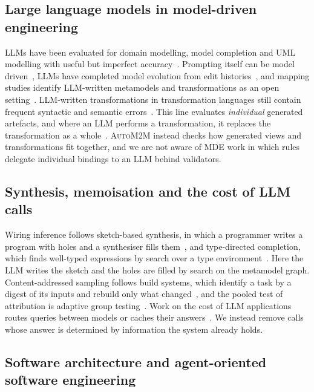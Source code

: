 \documentclass[pdflatex,sn-mathphys-num]{sn-jnl}
\theoremstyle{thmstyleone}%
\theoremstyle{thmstyletwo}%
\theoremstyle{thmstylethree}%
\newcommand{\auto}{\textsc{AutoM2M}}
\begin{document}
\subsection{Large language models in model-driven engineering}\label{sec:rw-llm-mde}

LLMs have been evaluated for domain modelling, model completion and UML
modelling with useful but imperfect
accuracy~\cite{chen2023domainmodeling,chaaben2023fewshot,camara2023chatgptuml,benchaaben2026utility}.
Prompting itself can be model driven~\cite{clariso2023mdpe}, LLMs have
completed model evolution from edit histories~\cite{tinnes2025evolution}, and
mapping studies identify LLM-written metamodels and transformations as an open
setting~\cite{dirocco2025llmmde,zhang2027llmmde}. LLM-written transformations in
transformation languages still contain frequent syntactic and semantic
errors~\cite{jiang2026llm4mtls,kazai2025mtllm}. This line evaluates
\emph{individual} generated artefacts, and where an LLM performs a
transformation, it replaces the transformation as a
whole~\cite{kazai2025mtllm}. \auto{} instead checks how generated views and
transformations fit together, and we are not aware of MDE work in which rules
delegate individual bindings to an LLM behind validators.

\subsection{Synthesis, memoisation and the cost of LLM calls}\label{sec:rw-cost}

Wiring inference follows sketch-based synthesis, in which a programmer writes a
program with holes and a synthesiser fills them~\cite{solarlezama2008sketch},
and type-directed completion, which finds well-typed expressions by search over
a type environment~\cite{gvero2013insynth}. Here the LLM writes the sketch and
the holes are filled by search on the metamodel graph. Content-addressed
sampling follows build systems, which identify a task by a digest of its inputs
and rebuild only what changed~\cite{mokhov2018build}, and the pooled test of
attribution is adaptive group testing~\cite{dorfman1943,hwang1972}. Work on the
cost of LLM applications routes queries between models or caches their
answers~\cite{chen2023frugalgpt}. We instead remove calls whose answer is
determined by information the system already holds.

\subsection{Software architecture and agent-oriented software engineering}\label{sec:rw-arch}
\end{document}
